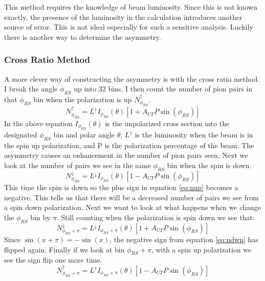 \documentclass[abstract = on,listof=totoc, bibliography=totoc]{scrreprt}
\begin{document}
This method requires the knowledge of beam luminosity. Since this is not known exactly, the presence of the luminosity in the calculation introduces another source of error. This is not ideal especially for such a sensitive analysis. Luckily there is another way to determine the asymmetry.   

\subsubsection{Cross Ratio Method}

A more clever way of constructing the asymmetry is with the cross ratio method\cite{crossRatio}. I break the angle $\phi_{RS}$ up into 32 bins. I then count the number of pion pairs in that $\phi_{RS}$ bin when the polarization is up $N^\uparrow_{\phi_{RS}}$. 
\begin{equation}
\label{eq:nup}
N^\uparrow_{\phi_{RS}} = L^\uparrow I_{\phi_{RS}}(\theta)\left[1+A_{UT}P\sin(\phi_{RS})\right]
\end{equation}
In the above equation $I_{\phi_{RS}}(\theta)$ is the unpolarized cross section into the designated $\phi_{RS}$ bin and polar angle $\theta$, $L^\uparrow$ is the luminosity when the beam is in the spin up polarization, and P is the polarization percentage of the beam. The asymmetry causes an enhancement in the number of pion pairs seen. Next we look at the number of pairs we see in the same $\phi_{RS}$ bin when the spin is down.
\begin{equation}
\label{eq:ndwn}
N^\downarrow_{\phi_{RS}} = L^\downarrow I_{\phi_{RS}}(\theta)\left[1-A_{UT}P\sin(\phi_{RS})\right]
\end{equation}
This time the spin is down so the plus sign in equation \ref{eq:nup} becomes a negative. This tells us that there will be a decreased number of pairs we see from a spin down polarization. 
Next we want to look at what happens when we change the $\phi_{RS}$ bin by $\pi$. Still counting when the polarization is spin down we see that:
\begin{equation}
\label{eq:ndwnphi}
N^\downarrow_{\phi_{RS}+\pi} = L^\downarrow I_{\phi_{RS}+\pi}(\theta)\left[1+A_{UT}P\sin(\phi_{RS})\right]
\end{equation}
Since $\sin(x+\pi) = -\sin(x)$, the negative sign from equation \ref{eq:ndwn} has flipped again. Finally if we look at bin $\phi_{RS} + \pi$, with a spin up polarization we see the sign flip one more time. 
\begin{equation}
\label{eq:nupphi}
N^\uparrow_{\phi_{RS}+\pi} = L^\uparrow I_{\phi_{RS}+\pi}(\theta)\left[1-A_{UT}P\sin(\phi_{RS})\right]
\end{equation}
\end{document}
